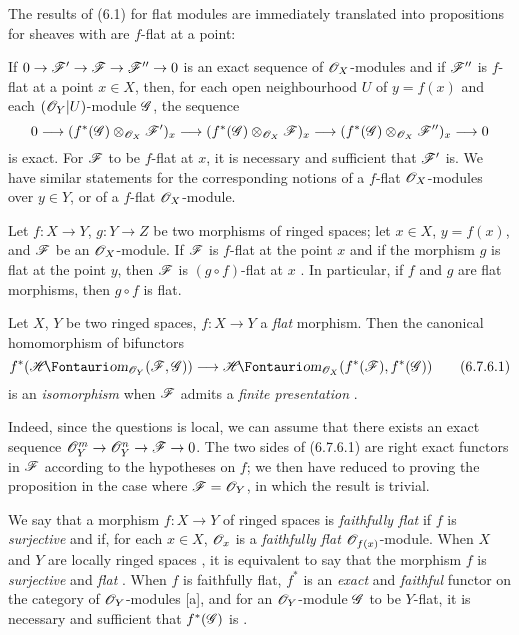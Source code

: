 \begin{env}[6.7.4]
\label{0.6.7.4}
The results of (6.1) for flat modules are immediately translated into propositions for
sheaves with are $f$-flat at a point:

If $0\to\sh{F}'\to\sh{F}\to\sh{F}''\to 0$ is an exact sequence of $\mathscr{O}_X$-modules and if
$\mathscr{F}''$ is $f$-flat at a point $x\in X$, then, for each open neighbourhood $U$ of $y=f(x)$
and each $(\mathscr{O}_Y|U)$-module $\mathscr{G}$, the sequence
\[
  0\to(f^*(\sh{G})\otimes_{\sh{O}_X}\sh{F}')_x
  \to(f^*(\sh{G})\otimes_{\sh{O}_X}\sh{F})_x
  \to(f^*(\sh{G})\otimes_{\sh{O}_X}\sh{F}'')_x\to 0
\]
is exact. For $\mathscr{F}$ to be $f$-flat at $x$, it is necessary and sufficient that $\mathscr{F}'$
is. We have similar statements for the corresponding notions of a $f$-flat $\mathscr{O}_X$-modules
over $y\in Y$, or of a $f$-flat $\mathscr{O}_X$-module.
\end{env}

\begin{env}[6.7.5]
\label{0.6.7.5}
Let $f:X\to Y$, $g:Y\to Z$ be two morphisms of ringed spaces; let $x\in X$, $y=f(x)$, and
$\mathscr{F}$ be an $\mathscr{O}_X$-module. If $\mathscr{F}$ is $f$-flat at the point $x$ and if the morphism
$g$ is flat at the point $y$, then $\mathscr{F}$ is $(g\circ f)$-flat at $x$ . In
particular, if $f$ and $g$ are flat morphisms, then $g\circ f$ is flat.
\end{env}

\begin{env}[6.7.6]
\label{0.6.7.6}
Let $X$, $Y$ be two ringed spaces, $f:X\to Y$ a \emph{flat} morphism. Then the canonical
homomorphism of bifunctors 
\[
\label{0.6.7.6.1}
  f^*(\shHom_{\sh{O}_Y}(\sh{F},\sh{G}))\to\shHom_{\sh{O}_X}(f^*(\sh{F}),f^*(\sh{G}))
  \tag{6.7.6.1}
\]
is an \emph{isomorphism} when $\mathscr{F}$ admits a \emph{finite presentation} .

Indeed, since the questions is local, we can assume that there exists an exact sequence
$\sh{O}_Y^m\to\sh{O}_Y^n\to\sh{F}\to 0$. The two sides of (6.7.6.1) are right exact functors in
$\mathscr{F}$ according to the hypotheses on $f$; we then have reduced to proving the proposition
in the case where $\mathscr{F}=\mathscr{O}_Y$, in which the result is trivial.
\end{env}

\begin{env}[6.7.8]
\label{0.6.7.8}
We say that a morphism $f:X\to Y$ of ringed spaces is \emph{faithfully flat} if $f$ is
\emph{surjective} and if, for each $x\in X$, $\mathscr{O}_x$ is a \emph{faithfully flat}
$\mathscr{O}_{f(x)}$-module. When $X$ and $Y$ are locally ringed spaces , it is
equivalent to say that the morphism $f$ is \emph{surjective} and \emph{flat}
. When $f$ is faithfully flat, $f^*$ is an \emph{exact} and \emph{faithful}
functor on the category of $\mathscr{O}_Y$-modules [a], and for an $\mathscr{O}_Y$-module
$\mathscr{G}$ to be $Y$-flat, it is necessary and sufficient that $f^*(\mathscr{G})$ is
.
\end{env}

